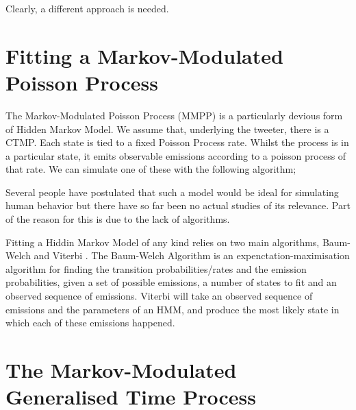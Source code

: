 Clearly, a different approach is needed.

\section{Fitting a Markov-Modulated Poisson Process}

The Markov-Modulated Poisson Process (MMPP) is a particularly devious form of Hidden Markov Model. We assume that, underlying the tweeter, there is a CTMP. Each state is tied to a fixed Poisson Process rate. Whilst the process is in a particular state, it emits observable emissions according to a poisson process of that rate. We can simulate one of these with the following algorithm;


Several people have postulated that such a model would be ideal for simulating human behavior %
but there have so far been no actual studies of its relevance. Part of the reason for this is due to the lack of algorithms.

Fitting a Hiddin Markov Model of any kind relies on two main algorithms, Baum-Welch %
and Viterbi
. The Baum-Welch Algorithm is an expenctation-maximisation algorithm for finding the transition probabilities/rates and the emission probabilities, given a set of possible emissions, a number of states to fit and an observed sequence of emissions. Viterbi will take an observed sequence of emissions and the parameters of an HMM, and produce the most likely state in which each of these emissions happened.

\section{The Markov-Modulated Generalised Time Process}